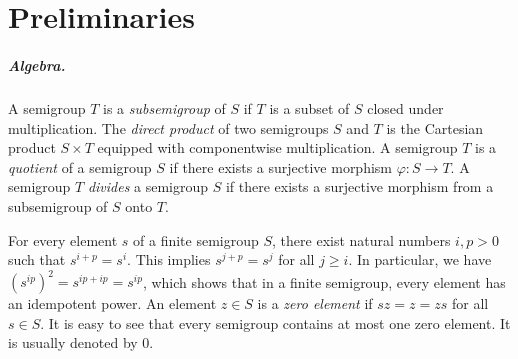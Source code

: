 \documentclass[11pt]{article}
\numberwithin{equation}{section}
\theoremstyle{definition}
\theoremstyle{plain}
\renewcommand{\geq}{\geqslant}
\renewcommand{\ge}{\geq}
\begin{document}
\section{Preliminaries}
\label{sec:prelim}

\subparagraph{Algebra.}

A semigroup $T$ is a \emph{subsemigroup} of $S$ if $T$ is a subset of $S$
closed under multiplication.
%
The \emph{direct product} of two semigroups $S$ and $T$ is the Cartesian
product $S \times T$ equipped with componentwise multiplication.
%
A semigroup $T$ is a \emph{quotient} of a semigroup $S$ if there exists a
surjective morphism $\varphi \colon S \to T$.
%
A semigroup $T$ \emph{divides} a semigroup $S$ if there exists a surjective
morphism from a subsemigroup of $S$ onto $T$.

For every element $s$ of a finite semigroup $S$, there exist natural
numbers $i, p > 0$ such that $s^{i+p} = s^i$.
%
This implies $s^{j+p} = s^j$ for all $j \ge i$. In particular, we have
$(s^{ip})^2 = s^{ip + ip} = s^{ip}$, which shows that in a finite semigroup,
every element has an idempotent power.
%
An element $z \in S$ is a \emph{zero element} if $sz = z = zs$ for all $s \in
S$. It is easy to see that every semigroup contains at most one zero element.
It is usually denoted by $0$.
\end{document}
